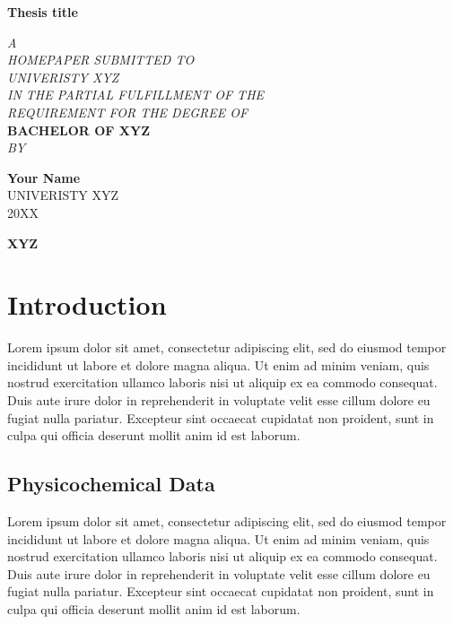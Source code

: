 \documentclass[a4paper,12pt]{report}
\begin{document}
\onehalfspacing
{}
\setlength\parindent{0pt}

\begin{titlepage}
   \begin{center}
       \vspace*{1cm}

       {\large \textbf{Thesis title}}

       \vspace{0.5cm}
        {\it A\\
        HOMEPAPER SUBMITTED TO\\
        UNIVERISTY XYZ\\
        IN THE PARTIAL FULFILLMENT OF THE\\
        REQUIREMENT FOR THE DEGREE OF}\\
        {\bf BACHELOR OF XYZ}\\
            
       \vspace{0.5cm}
       {\it BY}
       \vspace{0.5cm}

       \textbf{Your Name}\\
        UNIVERISTY XYZ\\
        20XX

       \vfill
        {\bf \hfill XYZ}
   \end{center}
\end{titlepage}
\newpage

\tableofcontents\thispagestyle{fancy}
\newpage

\listoffigures\thispagestyle{fancy}
\newpage

\listoftables\thispagestyle{fancy}
\newpage

\section[Introduction]{Introduction}
Lorem ipsum dolor sit amet, consectetur adipiscing elit, sed do eiusmod tempor incididunt ut labore et dolore magna aliqua. Ut enim ad minim veniam, quis nostrud exercitation ullamco laboris nisi ut aliquip ex ea commodo consequat. Duis aute irure dolor in reprehenderit in voluptate velit esse cillum dolore eu fugiat nulla pariatur. Excepteur sint occaecat cupidatat non proident, sunt in culpa qui officia deserunt mollit anim id est laborum.
\subsection{Physicochemical Data}
Lorem ipsum dolor sit amet, consectetur adipiscing elit, sed do eiusmod tempor incididunt ut labore et dolore magna aliqua. Ut enim ad minim veniam, quis nostrud exercitation ullamco laboris nisi ut aliquip ex ea commodo consequat. Duis aute irure dolor in reprehenderit in voluptate velit esse cillum dolore eu fugiat nulla pariatur. Excepteur sint occaecat cupidatat non proident, sunt in culpa qui officia deserunt mollit anim id est laborum.
\end{document}

